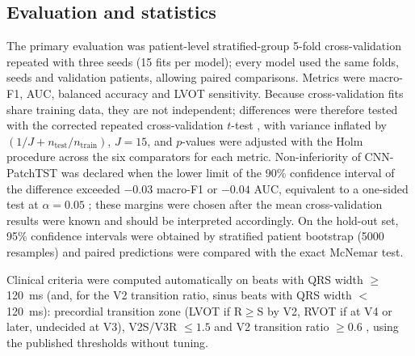 \documentclass[preprint,12pt]{elsarticle}
\begin{document}
\subsection{Evaluation and statistics}
The primary evaluation was patient-level stratified-group 5-fold cross-validation repeated with three seeds (15 fits per model); every model used the same folds, seeds and validation patients, allowing paired comparisons. Metrics were macro-F1, AUC, balanced accuracy and LVOT sensitivity. Because cross-validation fits share training data, they are not independent; differences were therefore tested with the corrected repeated cross-validation $t$-test \cite{nadeau2003inference,bouckaert2004evaluating}, with variance inflated by $(1/J + n_{\text{test}}/n_{\text{train}})$, $J=15$, and $p$-values were adjusted with the Holm procedure across the six comparators for each metric. Non-inferiority of CNN-PatchTST was declared when the lower limit of the 90\% confidence interval of the difference exceeded $-0.03$ macro-F1 or $-0.04$ AUC, equivalent to a one-sided test at $\alpha=0.05$ \cite{schuirmann1987tost}; these margins were chosen after the mean cross-validation results were known and should be interpreted accordingly. On the hold-out set, 95\% confidence intervals were obtained by stratified patient bootstrap (5000 resamples) and paired predictions were compared with the exact McNemar test.

Clinical criteria were computed automatically on beats with QRS width $\geq$120~ms (and, for the V2 transition ratio, sinus beats with QRS width $<$120~ms): precordial transition zone (LVOT if R$\geq$S by V2, RVOT if at V4 or later, undecided at V3), V2S/V3R $\leq 1.5$ \cite{yoshida2014v2sv3r} and V2 transition ratio $\geq 0.6$ \cite{betensky2011v2tr}, using the published thresholds without tuning.
\end{document}
